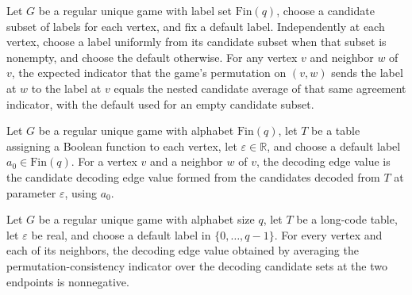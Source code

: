 \begin{theorem}
\label{FABL.RegularUniqueGame.pmfExpectation_candidateDecodingAssignmentLaw_edge}
\leanok
{}
Let $G$ be a regular unique game with label set $\text{Fin}(q)$, choose a candidate
subset of labels for each vertex, and fix a default label. Independently at each vertex,
choose a label uniformly from its candidate subset when that subset is nonempty, and
choose the default otherwise. For any vertex $v$ and neighbor $w$ of $v$, the expected
indicator that the game's permutation on $(v,w)$ sends the label at $w$ to the label at
$v$ equals the nested candidate average of that same agreement indicator, with the
default used for an empty candidate subset.
\end{theorem}

\begin{definition}
\label{FABL.RegularUniqueGame.decodingEdgeValue}
\leanok
{}
Let $G$ be a regular unique game with alphabet $\text{Fin}(q)$, let $T$ be a table
assigning a Boolean function to each vertex, let $\varepsilon\in\mathbb R$, and choose a
default label $a_0\in\text{Fin}(q)$. For a vertex $v$ and a neighbor $w$ of $v$, the
decoding edge value is the candidate decoding edge value formed from the candidates
decoded from $T$ at parameter $\varepsilon$, using $a_0$.
\end{definition}

\begin{theorem}
\label{FABL.RegularUniqueGame.decodingEdgeValue_nonneg}
\leanok
{}
Let $G$ be a regular unique game with alphabet size $q$, let $T$ be a long-code table,
let $\varepsilon$ be real, and choose a default label in $\{0,\ldots,q-1\}$. For every
vertex and each of its neighbors, the decoding edge value obtained by averaging the
permutation-consistency indicator over the decoding candidate sets at the two endpoints
is nonnegative.
\end{theorem}

